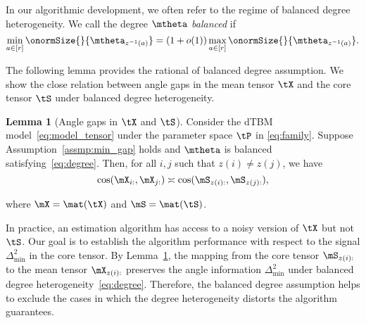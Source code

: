 \documentclass[lettersize,onecolumn,journal]{IEEEtran}
\theoremstyle{definition}
\newtheorem{lem}{Lemma}
\theoremstyle{definition}
\begin{document}
{
\color{blue}In our algorithmic development, we often refer to the regime of balanced degree heterogeneity. We call the degree $\mtheta$ \emph{balanced} if
\begin{equation}\label{eq:degree}
{\min_{a\in[r]} \onormSize{}{\mtheta_{z^{-1}(a)}}=\left(1+o(1)\right)\max_{a\in[r]}\onormSize{}{\mtheta_{z^{-1}(a)}}}.
\end{equation}

The following lemma provides the rational of balanced degree assumption. We show the close relation between angle gaps in the mean tensor $\tX$ and the core tensor $\tS$ under balanced degree heterogeneity. 


\begin{lem}[Angle gaps in $\tX$ and $\tS$]\label{lem:angle_gap_x} Consider the dTBM model~\eqref{eq:model_tensor} under the parameter space $\tP$ in \eqref{eq:family}. Suppose Assumption~\ref{assmp:min_gap} holds and $\mtheta$ is balanced satisfying~\eqref{eq:degree}. Then, for all $i,j$ such that $z(i) \neq z(j)$, we have
\begin{equation}
 \cos(\mX_{i:}, \mX_{j:})\asymp  \cos(\mS_{z(i):}, \mS_{z(j):}),
\end{equation}

where $\mX =\mat(\tX)$ and $\mS = \mat (\tS)$.
\end{lem}
In practice, an estimation algorithm has access to a noisy version of $\tX$ but not $\tS$. %
Our goal is to establish the algorithm performance with respect to the signal $\Delta^2_{\min}$ in the core tensor. By Lemma~\ref{lem:angle_gap_x}, the mapping from the core tensor $\mS_{z(i):}$ to the mean tensor $\mX_{z(i):}$ preserves the angle information $\Delta_{\min}^2$ under balanced degree heterogeneity~\eqref{eq:degree}. Therefore, the balanced degree assumption helps to exclude the cases in which the degree heterogeneity distorts the algorithm guarantees. 


}
\end{document}
